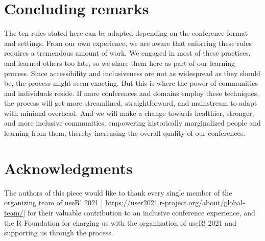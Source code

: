 \documentclass[10pt,letterpaper]{article}
\begin{document}
\section*{Concluding remarks}

The ten rules stated here can be adapted depending on the conference format and settings. From our own experience, %
we are aware that enforcing these rules requires a tremendous amount of work. We engaged in most of these practices, and learned others too late, so we share them here as part of our learning process. 
Since accessibility and inclusiveness are not as widespread as they should be, the process might seem exacting. But this is where the power of communities and individuals reside. If more conferences and domains employ these techniques, the process will get more streamlined, straightforward, and mainstream to adapt with minimal overhead. And we will make a change towards healthier, stronger, and more inclusive communities, empowering historically marginalized people and learning from them, thereby increasing the overall quality of our conferences.%



\section*{Acknowledgments}
The authors of this piece would like to thank every single member of the organizing team of useR! 2021 [ \url{https://user2021.r-project.org/about/global-team/}] for their valuable contribution to an inclusive conference experience, and the R Foundation for charging us with the organization of useR! 2021 and supporting us through the process. 








\end{document}
